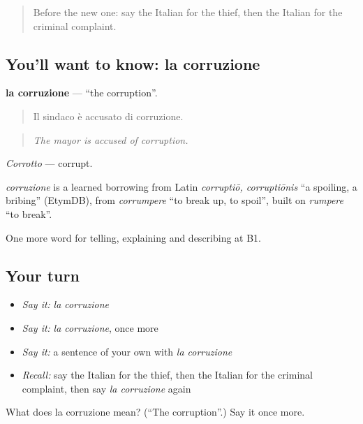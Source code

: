 \label{lesson:IT-C391-corruzione}



\begin{quote}
Before the new one: say the Italian for the thief, then the Italian for the criminal complaint.
\end{quote}

\subsection*{You'll want to know: la corruzione}
\textbf{la corruzione} — \textquotedblleft{}the corruption\textquotedblright{}.

\begin{quote}
Il sindaco è accusato di corruzione.
\end{quote}

\begin{quote}
\emph{The mayor is accused of corruption.}
\end{quote}

\emph{Corrotto} — corrupt.

\begin{cousinweb}
\emph{corruzione} is a learned borrowing from Latin \emph{corruptiō, corruptiōnis} \textquotedblleft{}a spoiling, a bribing\textquotedblright{} (EtymDB), from \emph{corrumpere} \textquotedblleft{}to break up, to spoil\textquotedblright{}, built on \emph{rumpere} \textquotedblleft{}to break\textquotedblright{}.
\end{cousinweb}

\begin{grammarlens}[title={What you've built}]
One more word for telling, explaining and describing at B1.
\end{grammarlens}

\subsection*{Your turn}
\begin{itemize}
\raggedright
  \item \emph{Say it:} \emph{la corruzione}
  \item \emph{Say it:} \emph{la corruzione}, once more
  \item \emph{Say it:} a sentence of your own with \emph{la corruzione}
  \item \emph{Recall:} say the Italian for the thief, then the Italian for the criminal complaint, then say \emph{la corruzione} again
\end{itemize}

\begin{tcolorbox}[breakable,colback=teal!4,colframe=teal!35!black,title={Before you move on}]
What does la corruzione mean? (\textquotedblleft{}The corruption\textquotedblright{}.) Say it once more.
\end{tcolorbox}
